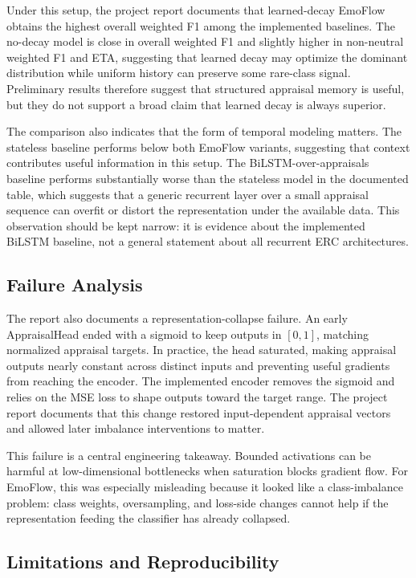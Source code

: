 \documentclass[11pt]{article}
\begin{document}
Under this setup, the project report documents that learned-decay EmoFlow obtains the highest overall weighted F1 among the implemented baselines. The no-decay model is close in overall weighted F1 and slightly higher in non-neutral weighted F1 and ETA, suggesting that learned decay may optimize the dominant distribution while uniform history can preserve some rare-class signal. Preliminary results therefore suggest that structured appraisal memory is useful, but they do not support a broad claim that learned decay is always superior.

The comparison also indicates that the form of temporal modeling matters. The stateless baseline performs below both EmoFlow variants, suggesting that context contributes useful information in this setup. The BiLSTM-over-appraisals baseline performs substantially worse than the stateless model in the documented table, which suggests that a generic recurrent layer over a small appraisal sequence can overfit or distort the representation under the available data. This observation should be kept narrow: it is evidence about the implemented BiLSTM baseline, not a general statement about all recurrent ERC architectures.

\subsection{Failure Analysis}

The report also documents a representation-collapse failure. An early AppraisalHead ended with a sigmoid to keep outputs in $[0,1]$, matching normalized appraisal targets. In practice, the head saturated, making appraisal outputs nearly constant across distinct inputs and preventing useful gradients from reaching the encoder. The implemented encoder removes the sigmoid and relies on the MSE loss to shape outputs toward the target range. The project report documents that this change restored input-dependent appraisal vectors and allowed later imbalance interventions to matter.

This failure is a central engineering takeaway. Bounded activations can be harmful at low-dimensional bottlenecks when saturation blocks gradient flow. For EmoFlow, this was especially misleading because it looked like a class-imbalance problem: class weights, oversampling, and loss-side changes cannot help if the representation feeding the classifier has already collapsed.

\subsection{Limitations and Reproducibility}
\end{document}
